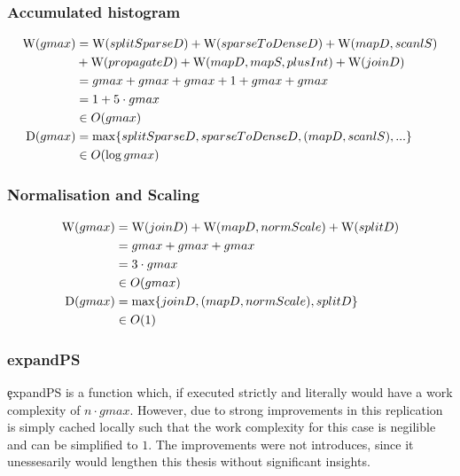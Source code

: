     \subsubsection*{Accumulated histogram}
      \begin{equation}
      \begin{split}
      \textrm{W}(gmax)
            & = \textrm{W}(splitSparseD) + \textrm{W}(sparseToDenseD) + \textrm{W}(mapD,scanlS) \\
            &     + \textrm{W}(propagateD) + \textrm{W}(mapD,mapS,plusInt) + \textrm{W}(joinD) \\
            & = gmax + gmax + gmax + 1 + gmax + gmax\\
            & = 1 + 5 \cdot gmax \\
            & \in O(gmax) \\
      \textrm{D}(gmax)
          & = \max \{ splitSparseD, sparseToDenseD, (mapD,scanlS),...\} \\
          & \in O(\log gmax)
      \end{split}
      \end{equation}
    
    \subsubsection*{Normalisation and Scaling}
      \begin{equation}
      \begin{split}
      \textrm{W}(gmax)
            & = \textrm{W}(joinD) + \textrm{W}(mapD,normScale) + \textrm{W}(splitD) \\
            & = gmax + gmax + gmax \\
            & = 3 \cdot gmax \\
            & \in O(gmax) \\
      \textrm{D}(gmax)
          & = \max \{ joinD,(mapD,normScale),splitD\} \\
          & \in O(1)
      \end{split}
      \end{equation}
      
    \subsubsection*{expandPS}
      \c{expandPS} is a function which, if executed strictly
      and literally would have a work complexity of $n \cdot gmax$.
      However, due to strong improvements in \cite{EffiVect2012Lipp}
      this replication is simply cached locally such that
      the work complexity for this case is negilible and
      can be simplified to $1$. The improvements were not
      introduces, since it unessesarily would lengthen this
      thesis without significant insights.
      
